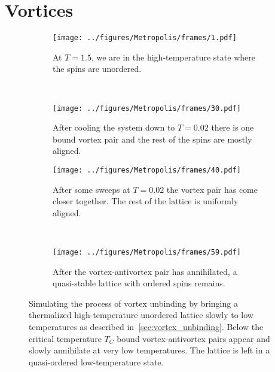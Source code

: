 \chapter{Vortices}\label{chap:vortices}
		\begin{figure}[H]
			\centering
			\begin{subfigure}[h]{0.45\textwidth}
				\centering
				\texttt{[image: ../figures/Metropolis/frames/1.pdf]}
				\caption{At $T=\num{1.5}$, we are in the high-temperature state where the spins are unordered.}
			\end{subfigure}
			~
			\begin{subfigure}[h]{0.45\textwidth}
				\centering
				\texttt{[image: ../figures/Metropolis/frames/30.pdf]}
				\caption{After cooling the system down to $T=\num{0.02}$ there is one bound vortex pair and the rest of the spins are mostly aligned.}
			\end{subfigure}
			\begin{subfigure}[h]{0.45\textwidth}
				\centering
				\texttt{[image: ../figures/Metropolis/frames/40.pdf]}
				\caption{After some sweeps at $T=\num{0.02}$ the vortex pair has come closer together. The rest of the lattice is uniformly aligned.}
			\end{subfigure}
			~
			\begin{subfigure}[h]{0.45\textwidth}
				\centering
				\texttt{[image: ../figures/Metropolis/frames/59.pdf]}
				\caption{After the vortex-antivortex pair has annihilated, a quasi-stable lattice with ordered spins remains.}
			\end{subfigure}
			\caption[Vortex unbinding of vortex-antivortex pairs at low temperatures]{Simulating the process of vortex unbinding by bringing a thermalized high-temperature unordered lattice slowly to low temperatures as described in~\cref{sec:vortex_unbinding}. Below the critical temperature $T_C$ bound vortex-antivortex pairs appear and slowly annihilate at very low temperatures. The lattice is left in a quasi-ordered low-temperature state.}
			\label{fig:vortex_unbinding}
		\end{figure}